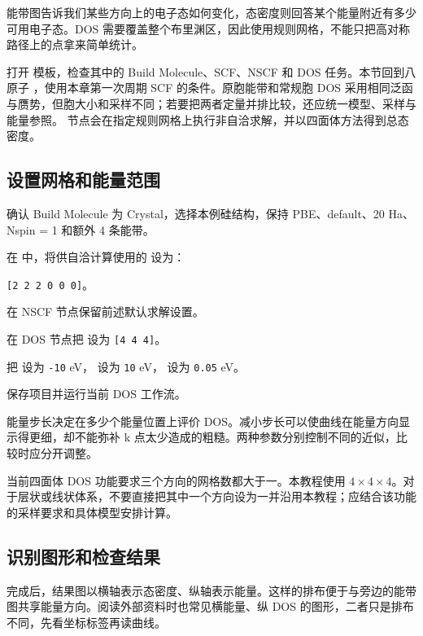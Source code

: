 能带图告诉我们某些方向上的电子态如何变化，态密度则回答某个能量附近有多少可用电子态。DOS 需要覆盖整个布里渊区，因此使用规则网格，不能只把高对称路径上的点拿来简单统计。

打开  模板，检查其中的 Build Molecule、SCF、NSCF 和 DOS 任务。本节回到八原子 ，使用本章第一次周期 SCF 的条件。原胞能带和常规胞 DOS 采用相同泛函与赝势，但胞大小和采样不同；若要把两者定量并排比较，还应统一模型、采样与能量参照。 节点会在指定规则网格上执行非自洽求解，并以四面体方法得到总态密度。

\subsection{设置网格和能量范围}

\begin{steps}
\item 确认 Build Molecule 为 Crystal，选择本例硅结构，保持 PBE、default、20 Ha、Nspin = 1 和额外 4 条能带。
\item 在  中，将供自洽计算使用的 \mbox{} 设为：
\par\nobreak\noindent\mbox{\texttt{[2 2 2 0 0 0]}}。
\item 在 NSCF 节点保留前述默认求解设置。
\item 在 DOS 节点把  设为 \texttt{[4 4 4]}。
\item 把  设为 \texttt{-10} eV， 设为 \texttt{10} eV， 设为 \texttt{0.05} eV。
\item 保存项目并运行当前 DOS 工作流。
\end{steps}

能量步长决定在多少个能量位置上评价 DOS。减小步长可以使曲线在能量方向显示得更细，却不能弥补 k 点太少造成的粗糙。两种参数分别控制不同的近似，比较时应分开调整。

当前四面体 DOS 功能要求三个方向的网格数都大于一。本教程使用 $4\times4\times4$。对于层状或线状体系，不要直接把其中一个方向设为一并沿用本教程；应结合该功能的采样要求和具体模型安排计算。


\subsection{识别图形和检查结果}

完成后，结果图以横轴表示态密度、纵轴表示能量。这样的排布便于与旁边的能带图共享能量方向。阅读外部资料时也常见横能量、纵 DOS 的图形，二者只是排布不同，先看坐标标签再读曲线。

